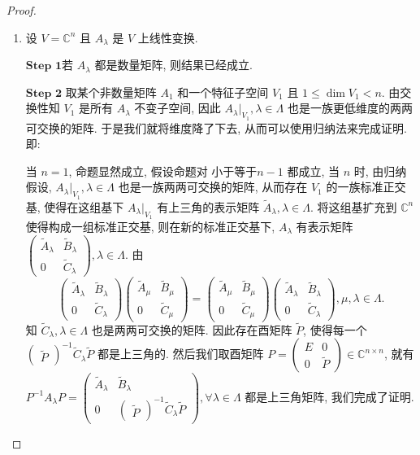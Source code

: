 \documentclass[../../main.tex]{subfiles}
\begin{document}
\begin{proof}
\begin{enumerate}
\item 设 $V = \mathbb{C}^n$ 且 $A_{\lambda}$ 是 $V$ 上线性变换.

$\mathbf{Step}\,\,\mathbf{1}$若 $A_{\lambda}$ 都是数量矩阵, 则结果已经成立.

$\mathbf{Step}\,\,\mathbf{2}$ 取某个非数量矩阵 $A_1$ 和一个特征子空间 $V_1$ 且 $1 \leq \dim V_1 < n$. 由交换性知 $V_1$ 是所有 $A_{\lambda}$ 不变子空间, 因此 $A_{\lambda}|_{V_1}, \lambda \in \Lambda$ 也是一族更低维度的两两可交换的矩阵. 于是我们就将维度降了下去, 从而可以使用归纳法来完成证明. 即:

当 $n = 1$, 命题显然成立, 假设命题对 小于等于$n - 1$ 都成立, 当 $n$ 时, 由归纳假设, $A_{\lambda}|_{V_1}, \lambda \in \Lambda$ 也是一族两两可交换的矩阵, 从而存在 $V_1$ 的一族标准正交基, 使得在这组基下 $A_{\lambda}|_{V_1}$ 有上三角的表示矩阵 $\widetilde{A}_{\lambda}, \lambda \in \Lambda$. 将这组基扩充到 $\mathbb{C}^n$ 使得构成一组标准正交基, 则在新的标准正交基下, $A_{\lambda}$ 有表示矩阵 $\begin{pmatrix} \widetilde{A}_{\lambda} & \widetilde{B}_{\lambda} \\ 0 & \widetilde{C}_{\lambda} \end{pmatrix}, \lambda \in \Lambda$. 由
\[
\begin{pmatrix} \widetilde{A}_{\lambda} & \widetilde{B}_{\lambda} \\ 0 & \widetilde{C}_{\lambda} \end{pmatrix} \begin{pmatrix} \widetilde{A}_{\mu} & \widetilde{B}_{\mu} \\ 0 & \widetilde{C}_{\mu} \end{pmatrix} = \begin{pmatrix} \widetilde{A}_{\mu} & \widetilde{B}_{\mu} \\ 0 & \widetilde{C}_{\mu} \end{pmatrix} \begin{pmatrix} \widetilde{A}_{\lambda} & \widetilde{B}_{\lambda} \\ 0 & \widetilde{C}_{\lambda} \end{pmatrix},\mu,\lambda \in \Lambda.
\]
知 $\widetilde{C}_{\lambda}, \lambda \in \Lambda$ 也是两两可交换的矩阵. 因此存在酉矩阵 $\widetilde{P}$, 使得每一个 $\begin{pmatrix} \widetilde{P} \end{pmatrix}^{-1} \widetilde{C}_{\lambda} \widetilde{P}$ 都是上三角的. 然后我们取酉矩阵 $P = \begin{pmatrix} E & 0 \\ 0 & \widetilde{P} \end{pmatrix} \in \mathbb{C}^{n \times n}$, 就有 $P^{-1}A_{\lambda}P = \begin{pmatrix} \widetilde{A}_{\lambda} & \widetilde{B}_{\lambda} \\ 0 & \begin{pmatrix} \widetilde{P} \end{pmatrix}^{-1} \widetilde{C}_{\lambda} \widetilde{P} \end{pmatrix}, \forall \lambda \in \Lambda$ 都是上三角矩阵, 我们完成了证明.


\end{enumerate}
\end{proof}
\end{document}
